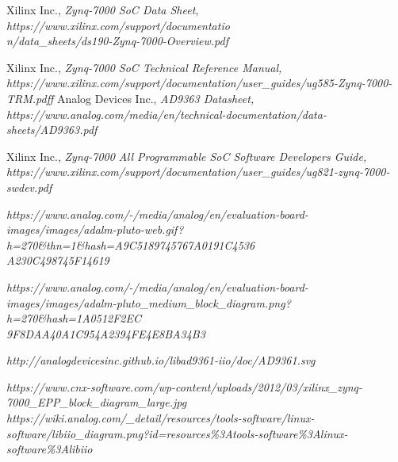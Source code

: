 \documentclass[en,printmode]{mgr}
\begin{document}
\begin{thebibliography}{9}
Xilinx Inc.,
\textit{Zynq-7000 SoC Data Sheet, https://www.xilinx.com/support/documentatio \\
n/data_sheets/ds190-Zynq-7000-Overview.pdf}

Xilinx Inc.,
\textit{Zynq-7000 SoC Technical Reference Manual, https://www.xilinx.com/support/documentation/user_guides/ug585-Zynq-7000-TRM.pdff}
Analog Devices Inc.,
\textit{AD9363 Datasheet, https://www.analog.com/media/en/technical-documentation/data-sheets/AD9363.pdf}

Xilinx Inc.,
\textit{Zynq-7000 All
Programmable SoC
Software Developers Guide, https://www.xilinx.com/support/documentation/user_guides/ug821-zynq-7000-swdev.pdf}

\textit{https://www.analog.com/-/media/analog/en/evaluation-board-images/images/adalm-pluto-web.gif?h=270\&thn=1\&hash=A9C5189745767A0191C4536 \\
A230C498745F14619}

\textit{https://www.analog.com/-/media/analog/en/evaluation-board-images/images/adalm-pluto_medium_block_diagram.png?h=270\&hash=1A0512F2EC \\
9F8DAA40A1C954A2394FE4E8BA34B3}

\textit{http://analogdevicesinc.github.io/libad9361-iio/doc/AD9361.svg}

\textit{https://www.cnx-software.com/wp-content/uploads/2012/03/xilinx_zynq-7000_EPP_block_diagram_large.jpg}
\textit{https://wiki.analog.com/_detail/resources/tools-software/linux-software/libiio_diagram.png?id=resources\%3Atools-software\%3Alinux-software\%3Alibiio}
\end{thebibliography}
\end{document}
